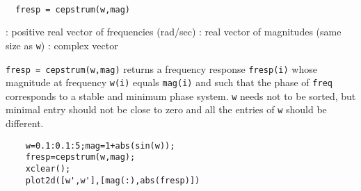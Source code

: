 
\begin{mandesc}
   \\ %
\end{mandesc}
\begin{calling_sequence}
\begin{verbatim}
  fresp = cepstrum(w,mag)  
\end{verbatim}
\end{calling_sequence}
\begin{parameters}
  \begin{varlist}
    : positive real vector of frequencies (rad/sec)
    : real vector of magnitudes (same size as \verb!w!)
    : complex vector
  \end{varlist}
\end{parameters}
\begin{mandescription}
  \verb!fresp = cepstrum(w,mag)! returns a frequency response \verb!fresp(i)!
  whose magnitude at frequency \verb!w(i)! equals \verb!mag(i)!  and such
  that the phase of \verb!freq! corresponds to a stable and minimum phase
  system. \verb!w! needs not to be sorted, but  minimal entry should not be
  close to zero and all the entries of \verb!w! should be different.
\end{mandescription}
\begin{examples}
  \begin{Verbatim}
    w=0.1:0.1:5;mag=1+abs(sin(w));
    fresp=cepstrum(w,mag);
    xclear();
    plot2d([w',w'],[mag(:),abs(fresp)])
  \end{Verbatim}
\end{examples}
\begin{manseealso}
\end{manseealso}
